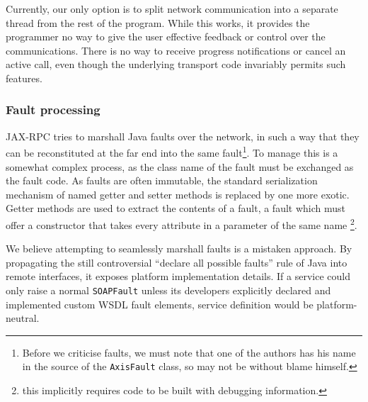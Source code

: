 Currently, our only option is to split network communication into a
separate thread from the rest of the program. While this works, it
provides the programmer no way to give the user effective feedback or
control over the communications. There is no way to receive progress
notifications or cancel an active call, even though the underlying
transport code invariably permits such features.


\subsubsection{Fault processing}
\label{objections:soap-not-rmi:faults}

JAX-RPC tries to marshall Java faults over the network, in such a way
that they can be reconstituted at the far end into the same
fault\footnote{Before we criticise faults, we must note that one of
the authors has his name in the source of the {\tt AxisFault} class,
so may not be without blame himself.}. To manage this is a somewhat
complex process, as the class name of the fault must be exchanged as
the fault code. As faults are often immutable, the standard
serialization mechanism of named getter and setter methods is replaced
by one more exotic. Getter methods are used to extract the contents of a
fault, a fault which must offer a constructor that takes every attribute
in a parameter of the same name
\footnote{this implicitly requires code to be built with debugging information.}. 

We believe attempting to seamlessly marshall faults is a mistaken
approach.  By propagating the still controversial ``declare all
possible faults'' rule of Java into remote interfaces, it exposes
platform implementation details. If a service could only raise a
normal {\tt SOAPFault} unless its developers explicitly declared and
implemented custom WSDL fault elements, service definition would be
platform-neutral.



